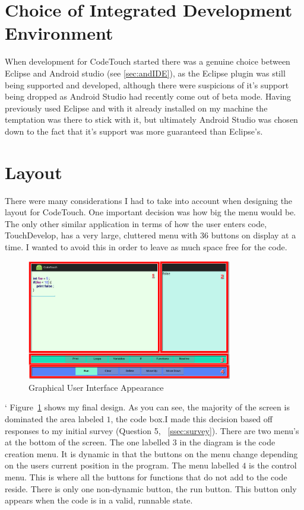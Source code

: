 \documentclass[ %
                    author={Jonathan Rankin},
                supervisor={Dr. David May, Dr. Ian Holyer},
                    degree={MEng},
                     title={CodeTouch},
                  subtitle={A Revolutionary Way To Program Real Code On Touch Screen Devices},
                      type={enterprise},
                      year={2015 } ]{dissertation}
\begin{document}
\section{Choice of Integrated Development Environment}

When development for CodeTouch started there was a genuine choice between Eclipse and Android studio (see \ref{sec:andIDE}), as the Eclipse plugin was still being supported and developed, although there were suspicions of it's support being dropped as Android Studio had recently come out of beta mode. Having previously used Eclipse and with it already installed on my machine the temptation was there to stick with it, but ultimately Android Studio was chosen down to the fact that it's support was more guaranteed than Eclipse's.

\section{Layout}
There were many considerations I had to take into account when designing the layout for CodeTouch. One important decision was how big the menu would be. The only other similar application in terms of how the user enters code, TouchDevelop, has a very large, cluttered menu with 36 buttons on display at a time. I wanted to avoid this in order to leave as much space free for the code. 

\begin{figure}[h]
\centering
\includegraphics[width=0.80\textwidth]{UIN}
\caption{Graphical User Interface Appearance}
\label{fig:ui}
\end{figure}
`
Figure~\ref{fig:ui} shows my final design. As you can see, the majority of the screen is dominated the area labeled $1$, the code box.I made this decision based off responses to my initial survey (Question 5, ~\ref{ssec:survey}). There are two menu's at the bottom of the screen. The one labelled $3$ in the diagram is the code creation menu. It is dynamic in that the buttons on the menu change depending on the users current position in the program. The menu labelled $4$ is the control menu. This is where all the buttons for functions that do not add to the code reside. There is only one non-dynamic button, the run button. This button only appears when the code is in a valid, runnable state. 
\end{document}

